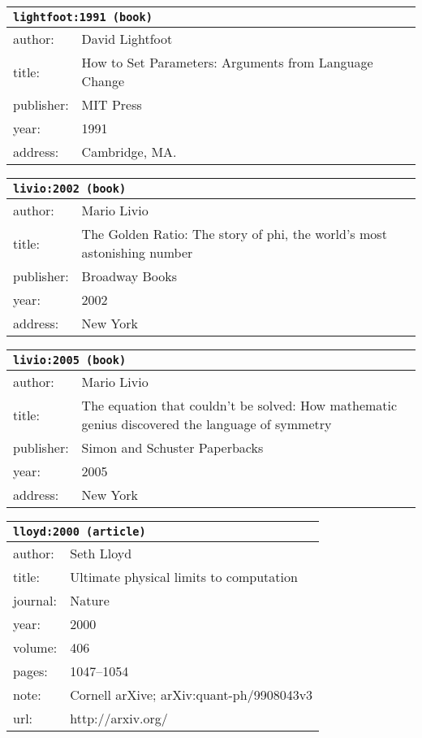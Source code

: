 \documentclass{article}
\begin{document}
\bigskip

\begin{tabular}{p{}p{}}
\multicolumn{2}{l}{\texttt{lightfoot:1991 (book)}}\\
\hline
author: & David Lightfoot\\
title: & How to Set Parameters: Arguments from Language Change\\
publisher: & MIT Press\\
year: & 1991\\
address: & Cambridge, MA.\\
\end{tabular}

\bigskip

\begin{tabular}{p{}p{}}
\multicolumn{2}{l}{\texttt{livio:2002 (book)}}\\
\hline
author: & Mario Livio\\
title: & The Golden Ratio: The story of phi, the world's most astonishing number\\
publisher: & Broadway Books\\
year: & 2002\\
address: & New York\\
\end{tabular}

\bigskip

\begin{tabular}{p{}p{}}
\multicolumn{2}{l}{\texttt{livio:2005 (book)}}\\
\hline
author: & Mario Livio\\
title: & The equation that couldn't be solved: How mathematic genius discovered the language of symmetry\\
publisher: & Simon and Schuster Paperbacks\\
year: & 2005\\
address: & New York\\
\end{tabular}

\bigskip

\begin{tabular}{p{}p{}}
\multicolumn{2}{l}{\texttt{lloyd:2000 (article)}}\\
\hline
author: & Seth Lloyd\\
title: & Ultimate physical limits to computation\\
journal: & Nature\\
year: & 2000\\
volume: & 406\\
pages: & 1047--1054\\
note: & Cornell arXive; arXiv:quant-ph/9908043v3\\
url: & http://arxiv.org/\\
\end{tabular}
\end{document}
